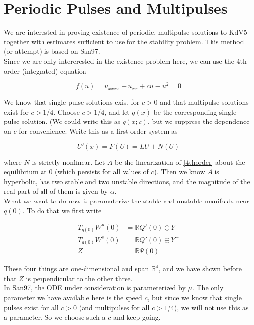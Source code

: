 \documentclass[12pt]{article}
\def\R{{\mathbb R}}
\begin{document}
\section{Periodic Pulses and Multipulses}

We are interested in proving existence of periodic, multipulse solutions to KdV5 together with estimates sufficient to use for the stability problem. This method (or attempt) is based on San97.\\

Since we are only intererested in the existence problem here, we can use the 4th order (integrated) equation

\begin{equation}\label{4thorder}
f(u) = u_{xxxx} - u_{xx} + c u - u^2 = 0
\end{equation}

We know that single pulse solutions exist for $c > 0$ and that multipulse solutions exist for $c > 1/4$. Choose $c > 1/4$, and let $q(x)$ be the corresponding single pulse solution. (We could write this as $q(x; c)$, but we suppress the dependence on $c$ for convenience. Write this as a first order system as

\[
U'(x) = F(U) = LU + N(U)
\]

where $N$ is strictly nonlinear. Let $A$ be the linearization of \eqref{4thorder} about the equilibrium at 0 (which persists for all values of $c$). Then we know $A$ is hyperbolic, has two stable and two unstable directions, and the magnitude of the real part of all of them is given by $\alpha$. 
\\

What we want to do now is paramaterize the stable and unstable manifolds near $q(0)$. To do that we first write

\begin{align*}
T_{q(0)}W^u(0) &= \R Q'(0) \oplus Y^- \\
T_{q(0)}W^s(0) &= \R Q'(0) \oplus Y^+ \\
Z &= \R \Psi(0)
\end{align*}

These four things are one-dimensional and span $\R^4$, and we have shown before that $Z$ is perpendicular to the other three. \\

In San97, the ODE under consideration is parameterized by $\mu$. The only parameter we have available here is the speed $c$, but since we know that single pulses exist for all $c > 0$ (and multipulses for all $c > 1/4$), we will not use this as a parameter. So we choose such a $c$ and keep going.\\
\end{document}
